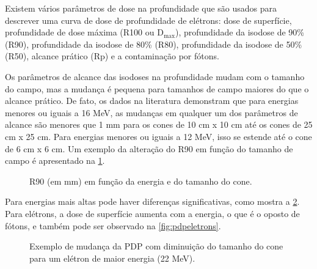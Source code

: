 \documentclass[11pt,a4paper]{article}
\newcounter{exemplo}
\begin{document}
	Existem vários parâmetros de dose na profundidade que são usados para descrever uma curva de dose de profundidade de elétrons: dose de superfície, profundidade de dose máxima (R100 ou $\mathrm{D_{max}}$), profundidade da isodose de 90\% (R90), profundidade da isodose de 80\% (R80), profundidade da isodose de 50\% (R50), alcance prático (Rp) e a contaminação por fótons.

	Os parâmetros de alcance das isodoses na profundidade mudam com o tamanho do campo, mas a mudança é pequena para tamanhos de campo maiores do que o alcance prático. De fato, os dados na literatura demonstram que para energias menores ou iguais a 16 MeV, as mudanças em qualquer um dos parâmetros de alcance são menores que 1 mm para os cones de 10 cm x 10 cm até os cones de 25 cm x 25 cm. Para energias menores ou iguais a 12 MeV, isso se estende até o cone de 6 cm x 6 cm. Um exemplo da alteração do R90 em função do tamanho de campo é apresentado na \ref{fig:r90}.
	
	\begin{figure}[h]
		\centering
		\caption{R90 (em mm) em função da energia e do tamanho do cone.}
		\label{fig:r90}
	\end{figure}
	
	Para energias mais altas pode haver diferenças significativas, como mostra a \ref{fig:pdpeletronsECampo}. Para elétrons, a dose de superfície aumenta com a energia, o que é o oposto de fótons, e também pode ser observado na \ref{fig:pdpeletrons}.

	\begin{figure}[h]
		\centering
		\caption{Exemplo de mudança da PDP com diminuição do tamanho do cone para um elétron de maior energia (22 MeV).}
		\label{fig:pdpeletronsECampo}
	\end{figure}
\end{document}
